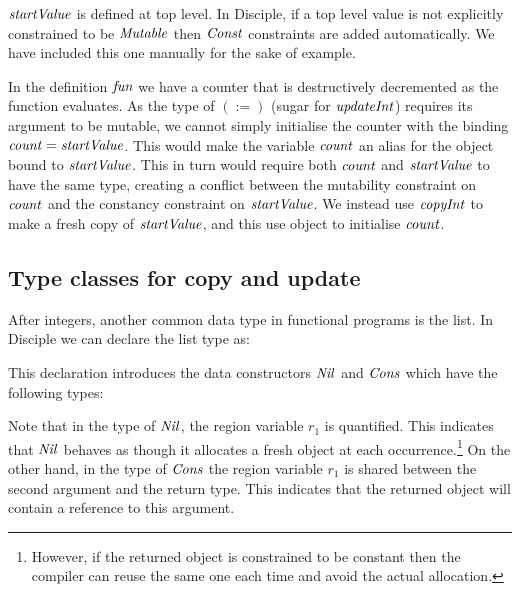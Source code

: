 $\operatorname{\mathit{startValue}}$ is defined at top level. In Disciple, if a top level value is not explicitly constrained to be $\operatorname{\mathit{Mutable}}$ then $\operatorname{\mathit{Const}}$ constraints are added automatically. We have included this one manually for the sake of example.

In the definition $\operatorname{\mathit{fun}}$ we have a counter that is destructively decremented as the function evaluates. As the type of $(:=)$ (sugar for $\operatorname{\mathit{updateInt}}$) requires its argument to be mutable, we cannot simply initialise the counter with the binding $\operatorname{\mathit{count}} = \operatorname{\mathit{startValue}}$. This would make the variable $\operatorname{\mathit{count}}$ an alias for the object bound to $\operatorname{\mathit{startValue}}$. This in turn would require both $\operatorname{\mathit{count}}$ and $\operatorname{\mathit{startValue}}$ to have the same type, creating a conflict between the mutability constraint on $\operatorname{\mathit{count}}$ and the constancy constraint on $\operatorname{\mathit{startValue}}$. We instead use $\operatorname{\mathit{copyInt}}$ to make a fresh copy of $\operatorname{\mathit{startValue}}$, and this use object to initialise $\operatorname{\mathit{count}}$. 



\subsection{Type classes for copy and update}
\label{System:TypeClassing:copy-and-update}

After integers, another common data type in functional programs is the list. In Disciple we can declare the list type as:


This declaration introduces the data constructors $\operatorname{\mathit{Nil}}$ and $\operatorname{\mathit{Cons}}$ which have the following types:


Note that in the type of $\operatorname{\mathit{Nil}}$, the region variable $r_1$ is quantified. This indicates that $\operatorname{\mathit{Nil}}$ behaves as though it allocates a fresh object at each occurrence.\footnote{However, if the returned object is constrained to be constant then the compiler can reuse the same one each time and avoid the actual allocation.} On the other hand, in the type of $\operatorname{\mathit{Cons}}$ the region variable $r_1$ is shared between the second argument and the return type. This indicates that the returned object will contain a reference to this argument.

